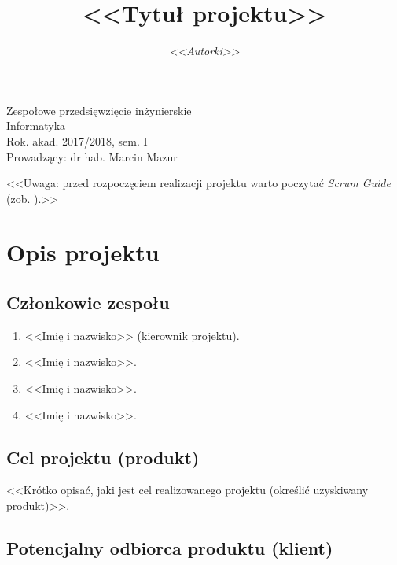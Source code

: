\documentclass[a4paper]{amsart}
\title{\bf{<<Tytuł projektu>>}}
\author{{\em <<Autorki>>}}
\date{}
\begin{document}
\begin{titlepage}
\maketitle
\thispagestyle{empty}
\bigskip
\begin{center}
Zespołowe przedsięwzięcie inżynierskie\\[2mm]

Informatyka\\[2mm]

Rok. akad. 2017/2018, sem. I\\[2mm]

Prowadzący: dr hab. Marcin Mazur
\end{center}
\end{titlepage}

\tableofcontents
\thispagestyle{empty}

\newpage

<<Uwaga: przed rozpoczęciem realizacji projektu warto poczytać {\em Scrum Guide} (zob. \cite{SchSut}).>>

\section{Opis projektu}

\subsection{Członkowie zespołu}

\begin{enumerate}
\item <<Imię i nazwisko>> (kierownik projektu).
\item <<Imię i nazwisko>>.
\item <<Imię i nazwisko>>.
\item <<Imię i nazwisko>>.
\end{enumerate}

\subsection{Cel projektu (produkt)}

<<Krótko opisać, jaki jest cel realizowanego projektu (określić uzyskiwany produkt)>>.

\subsection{Potencjalny odbiorca produktu (klient)}
\end{document}

